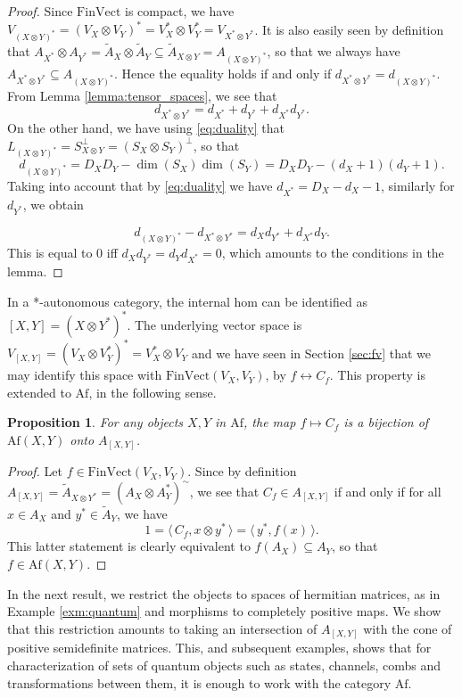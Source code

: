 \documentclass[12pt]{article}
\newtheorem{prop}{Proposition}
\theoremstyle{definition}
\theoremstyle{remark}
\def\<{\langle\,}
\def\>{\,\rangle}
\def \Af{\mathrm{Af}}
\def \FV{\mathrm{FinVect}}
\begin{document}
\begin{proof} Since $\FV$ is compact, we have $V_{(X\otimes Y)^*}=(V_X\otimes
V_Y)^*=V_X^*\otimes V_Y^*=V_{X^*\otimes Y^*}$. It is also easily seen by definition that $A_{X^*}\otimes A_{Y^*}=\tilde A_X\otimes \tilde
A_Y\subseteq \tilde A_{X\otimes Y}=A_{(X\otimes Y)^*}$, so that we always have $A_{X^*\otimes
Y^*}\subseteq A_{(X\otimes Y)^*}$.  Hence the equality holds if and
only if $d_{X^*\otimes Y^*}=d_{(X\otimes Y)^*}$. From Lemma
\ref{lemma:tensor_spaces}, we see that
\[
d_{X^*\otimes Y^*}=d_{X^*}+d_{Y^*}+d_{X^*}d_{Y^*}.
\]
On the other hand, we have using \eqref{eq:duality} that $L_{(X\otimes Y)^*}=S_{X\otimes
Y}^\perp=(S_X\otimes S_Y)^\perp$, so that
\[
d_{(X\otimes Y)^*}=D_XD_Y-\dim(S_X)\dim(S_Y)=D_XD_Y-(d_X+1)(d_Y+1).
\]
Taking into account that by \eqref{eq:duality} we have $d_{X^*}=D_X-d_{X}-1$, similarly
for $d_{Y^*}$, we obtain

\[
d_{(X\otimes Y)^*}-d_{X^*\otimes Y^*}=d_Xd_{Y^*}+d_{X^*}d_Y.
\]
This is equal to 0 iff $d_Xd_{Y^*}=d_Yd_{X^*}=0$, which amounts to the conditions in the
lemma.

\end{proof}



In a *-autonomous category, the internal hom can be identified as $[X,Y]=(X\otimes
Y^*)^*$. The underlying vector space is $V_{[X,Y]}=(V_X\otimes V_Y^*)^*=V_X^*\otimes V_Y$
and we have seen in Section \ref{sec:fv} that we may identify this space with
$\FV(V_X,V_Y)$, by $f \leftrightarrow C_f$. This property is extended to $\Af$, in the
following sense.

\begin{prop}\label{prop:ihom_morphisms} For any objects $X,Y$ in $\Af$, the map $f\mapsto C_f$ is a bijection
of $\Af(X,Y)$ onto $A_{[X,Y]}$. 

\end{prop}

\begin{proof} Let $f\in \FV(V_X,V_Y)$. Since by definition $A_{[X,Y]}=\tilde A_{X\otimes
Y^*}=(A_X\otimes A_Y^*)^\sim$, we see that $C_f\in A_{[X,Y]}$ if and only
if for all $x\in A_X$ and $y^*\in \tilde A_Y$, we have
\[
1=\<C_f, x\otimes y^*\>=\<y^*,f(x)\>.
\]
This latter statement is clearly equivalent to $f(A_X)\subseteq A_Y$, so that $f\in
\Af(X,Y)$. 
\end{proof}

In the next result, we restrict the objects to spaces of hermitian matrices, as in Example
\ref{exm:quantum} and morphisms to completely positive maps. We show that this restriction
amounts to taking an intersection of $A_{[X,Y]}$ with the cone of positive semidefinite
matrices. This, and subsequent examples,  shows that for characterization of sets  of quantum
objects such as states, channels, combs and transformations between them, it is enough to
work with the category $\Af$. 
\end{document}

